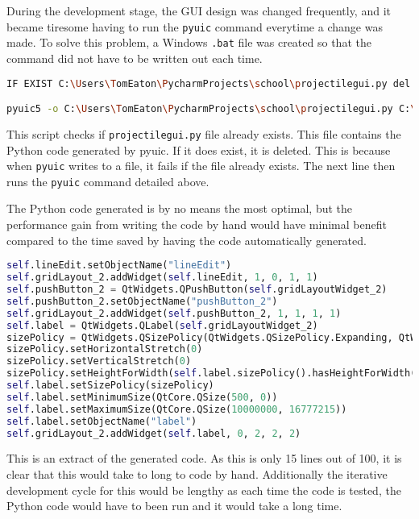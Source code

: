 During the development stage, the GUI design was changed frequently, and it became tiresome having to run the \texttt{pyuic} command everytime a change was made. To solve this problem, a Windows \texttt{.bat} file was created so that the command did not have to be written out each time. 
\begin{lstlisting}[language=bash, caption=Batch script to update Python code]
IF EXIST C:\Users\TomEaton\PycharmProjects\school\projectilegui.py del /F C:\Users\TomEaton\PycharmProjects\school\projectilegui.py 

pyuic5 -o C:\Users\TomEaton\PycharmProjects\school\projectilegui.py C:\Users\TomEaton\Documents\suvat\suvat.ui
\end{lstlisting}
This script checks if \texttt{projectilegui.py} file already exists. This file contains the Python code generated by pyuic. If it does exist, it is deleted. This is because when \texttt{pyuic} writes to a file, it fails if the file already exists. The next line then runs the \texttt{pyuic} command detailed above.

The Python code generated is by no means the most optimal, but the performance gain from writing the code by hand would have minimal benefit compared to the time saved by having the code automatically generated.

\begin{lstlisting}[language=Python, caption=\texttt{PyQt} code generated by \texttt{pyuic}]
self.lineEdit.setObjectName("lineEdit")
self.gridLayout_2.addWidget(self.lineEdit, 1, 0, 1, 1)
self.pushButton_2 = QtWidgets.QPushButton(self.gridLayoutWidget_2)
self.pushButton_2.setObjectName("pushButton_2")
self.gridLayout_2.addWidget(self.pushButton_2, 1, 1, 1, 1)
self.label = QtWidgets.QLabel(self.gridLayoutWidget_2)
sizePolicy = QtWidgets.QSizePolicy(QtWidgets.QSizePolicy.Expanding, QtWidgets.QSizePolicy.Preferred)
sizePolicy.setHorizontalStretch(0)
sizePolicy.setVerticalStretch(0)
sizePolicy.setHeightForWidth(self.label.sizePolicy().hasHeightForWidth())
self.label.setSizePolicy(sizePolicy)
self.label.setMinimumSize(QtCore.QSize(500, 0))
self.label.setMaximumSize(QtCore.QSize(10000000, 16777215))
self.label.setObjectName("label")
self.gridLayout_2.addWidget(self.label, 0, 2, 2, 2)
\end{lstlisting}
This is an extract of the generated code. As this is only 15 lines out of 100, it is clear that this would take to long to code by hand. Additionally the iterative development cycle for this would be lengthy as each time the code is tested, the Python code would have to been run and it would take a long time.

